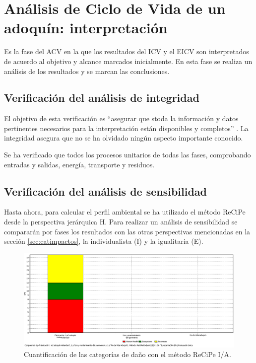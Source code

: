 \chapter{Análisis de Ciclo de Vida de un adoquín: interpretación}\label{cap:acv_interpretacion}

Es la fase del ACV en la que los resultados del ICV y el EICV son interpretados de acuerdo al objetivo y alcance marcados inicialmente. En esta fase se realiza un análisis de los resultados y se marcan las conclusiones.


\section{Verificación del análisis de integridad}

El objetivo de esta verificación es ``asegurar que stoda la información y datos pertinentes necesarios para la interpretación están disponibles y completos'' \cite{iso14044}. La integridad asegura que no se ha olvidado ningún aspecto importante conocido.

Se ha verificado que todos los procesos unitarios de todas las fases, comprobando entradas y salidas, energía, transporte y residuos.

\section{Verificación del análisis de sensibilidad}

Hasta ahora, para calcular el perfil ambiental se ha utilizado el método ReCiPe desde la perspectiva jerárquica H. Para realizar un análisis de sensibilidad se compararán por fases los resultados con las otras perspectivas mencionadas en la sección \ref{sec:catimpactos}, la individualista (I) y la igualitaria (E).

\begin{figure}[!htb]
\centering
\includegraphics[width=15cm]{img/sensibilidad_ia_puntuacionunica.png}
\caption{Cuantificación de las categorías de daño con el método ReCiPe I/A.}
\label{fig:sensibilidad_ia_puntuacionunica}
\end{figure}


